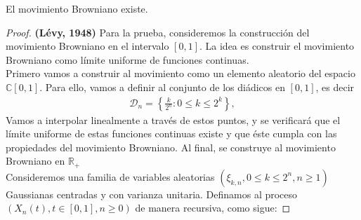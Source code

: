 \begin{theorem}[Wiener, 1923]
El movimiento Browniano existe.
\end{theorem}
\begin{proof}
\textbf{(Lévy, 1948)} Para la prueba, consideremos la construcción del movimiento Browniano en el intervalo $[0, 1]$. La idea es construir el movimiento Browniano como límite uniforme de funciones continuas. \\ %

Primero vamos a construir al movimiento como un elemento aleatorio del espacio $\mathbb{C}[0, 1]$. Para ello, vamos a definir al conjunto de los diádicos en $[0, 1]$, es decir %
	\begin{align*}
		\mathcal{D}_n = \left\{ \frac{k}{2^n} : 0 \leq k \leq 2^k \right\},
	\end{align*}
Vamos a interpolar linealmente a través de estos puntos, y se verificará que el límite uniforme de estas funciones continuas existe y que éste cumpla con las propiedades del movimiento Browniano. Al final, se construye al movimiento Browniano en $\mathbb{R}_{+}$\\

Consideremos una familia de variables aleatorias $(\xi_{k, n}, 0 \leq k \leq 2^n, n \geq 1)$ Gaussianas centradas y con varianza unitaria. Definamos al proceso $(X_n (t), t \in [0, 1], n \geq 0)$ de manera recursiva, como sigue:


\end{proof}
